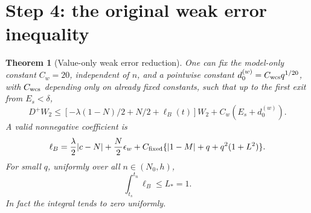 \documentclass[11pt]{article}
\numberwithin{equation}{section}
\newtheorem{theorem}{Theorem}[section]
\theoremstyle{remark}\newtheorem{remark}[theorem]{Remark}
\begin{document}
\section{Step 4: the original weak error inequality}
\begin{theorem}[Value-only weak error reduction]
\label{an03wcsv1:weakerror}
One can fix the model-only constant $C_w=20$, independent of $n$,
and a pointwise constant $d_0^{(w)}=C_{\rm wcs}q^{1/20}$,
with $C_{\rm wcs}$ depending only on already fixed constants,
such that up to the first exit from $E_s<\delta$,
\begin{equation}
 D^+W_2\le[-\lambda(1-N)/2+N/2+\ell_B(t)]W_2
                         +C_w(E_s+d_0^{(w)}).
 \label{an03wcsv1:weakineq}
\end{equation}
A valid nonnegative coefficient is
\begin{equation}
 \ell_B=\frac{\lambda}{2}|c-N|+\frac N2\epsilon_w
       +C_{\rm fixed}\{|1-M|+q+q^2(1+L^2)\}.
 \label{an03wcsv1:ellB}
\end{equation}
For small $q$, uniformly over all $n\in(N_0,h)$,
\begin{equation}
 \int_{t_s}^{t_n}\ell_B\le L_*=1.
 \label{an03wcsv1:Lstar}
\end{equation}
In fact the integral tends to zero uniformly.
\end{theorem}
\end{document}
